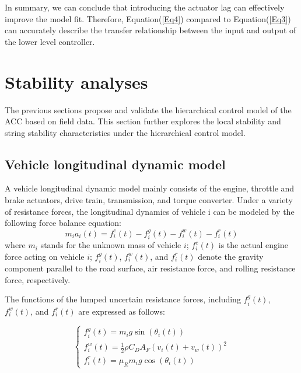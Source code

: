 \documentclass[a4paper]{cas-sc}
\begin{document}
In summary, we can conclude that introducing the actuator lag can effectively improve the model fit. Therefore, Equation(\ref{Eq4}) compared to Equation(\ref{Eq3}) can accurately describe the transfer relationship between the input and output of the lower level controller.






\section{Stability analyses}
\label{Section 4}

The previous sections propose and validate the hierarchical control model of the ACC based on field data. This section further explores the local stability and string stability characteristics under the hierarchical control model.

\subsection{Vehicle longitudinal dynamic model}
\label{Section 4.1}

A vehicle longitudinal dynamic model mainly consists of the engine, throttle and brake actuators, drive train, transmission, and torque converter. Under a variety of resistance forces, the longitudinal dynamics of vehicle i can be modeled by the following force balance equation:
\begin{equation}
  m_ia_i(t)=f_i^e(t)-f_i^g(t)-f_i^w(t)-f_i^r(t)
  \label{Eq13}
\end{equation}
where $m_i$ stands for the unknown mass of vehicle $i$; $f_i^e(t)$ is the actual engine force acting on vehicle $i$; $f_i^g(t)$, $f_i^w(t)$, and $f_i^r(t)$ denote the gravity component parallel to the road surface, air resistance force, and rolling resistance force, respectively.

The functions of the lumped uncertain resistance forces, including $f_i^g(t)$, $f_i^w(t)$, and $f_i^r(t)$ are expressed as follows:

\begin{equation}
  \left\{\begin{array}{l}
    f_{i}^{g}(t)=m_{i} g \sin \left(\theta_{i}(t)\right)                        \\
    f_{i}^{w}(t)=\frac{1}{2} \rho C_{D} A_{F}\left(v_{i}(t)+v_{w}(t)\right)^{2} \\
    f_{i}^{r}(t)=\mu_{R} m_{i} g \cos \left(\theta_{i}(t)\right)
  \end{array}\right.
  \label{Eq14}
\end{equation}
\end{document}
